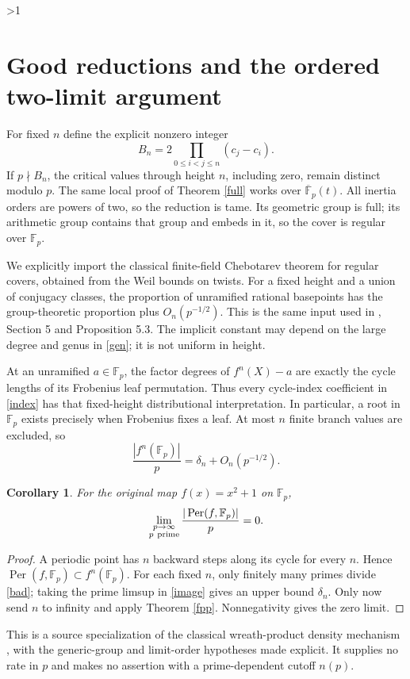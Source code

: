 \documentclass[10pt]{article}
\newtheorem{corollary}{Corollary}
\newcommand{\Per}{\operatorname{Per}}
\begin{document}
\ifnum\CRevisionRound>1
\section{Good reductions and the ordered two-limit argument}
For fixed $n$ define the explicit nonzero integer
\begin{equation}\label{bad}
 B_n=2\prod_{0\le i<j\le n}(c_j-c_i).
\end{equation}
If $p\nmid B_n$, the critical values through height $n$, including zero,
remain distinct modulo $p$. The same local proof of Theorem \ref{full}
works over $\overline{\mathbb F}_p(t)$. All inertia orders are powers of
two, so the reduction is tame. Its geometric group is full; its
arithmetic group contains that group and embeds in it, so the cover
is regular over $\mathbb F_p$.

We explicitly import the classical finite-field Chebotarev theorem for
regular covers, obtained from the Weil bounds on twists.
For a fixed height and a union of conjugacy classes, the proportion of
unramified rational basepoints has the group-theoretic proportion plus
$O_n(p^{-1/2})$. This is the same input used in \cite{jkmt},
Section 5 and Proposition 5.3. The implicit constant may depend on the
large degree and genus in \eqref{gen}; it is not uniform in height.

At an unramified $a\in\mathbb F_p$, the factor degrees of
$f^n(X)-a$ are exactly the cycle lengths of its Frobenius leaf permutation.
Thus every cycle-index coefficient in \eqref{index} has that fixed-height
distributional interpretation. In particular, a root in $\mathbb F_p$
exists precisely when Frobenius fixes a leaf.
At most $n$ finite branch values are excluded, so
\begin{equation}\label{image}
 \frac{|f^n(\mathbb F_p)|}{p}=\delta_n+O_n(p^{-1/2}).
\end{equation}

\begin{corollary}\label{density}
For the original map $f(x)=x^2+1$ on $\mathbb F_p$,
\[
 \lim_{\substack{p\to\infty\\p\ {\rm prime}}}
        \frac{|\Per(f,\mathbb F_p)|}{p}=0.
\]
\end{corollary}
\begin{proof}
A periodic point has $n$ backward steps along its cycle for every $n$.
Hence $\Per(f,\mathbb F_p)\subset f^n(\mathbb F_p)$.
For each fixed $n$, only finitely many primes divide \eqref{bad};
taking the prime limsup in \eqref{image} gives an upper bound $\delta_n$.
Only now send $n$ to infinity and apply Theorem \ref{fpp}.
Nonnegativity gives the zero limit.
\end{proof}
This is a source specialization of the classical wreath-product density
mechanism \cite{jkmt}, with the generic-group and limit-order hypotheses
made explicit. It supplies no rate in $p$ and makes no assertion with
a prime-dependent cutoff $n(p)$.
\end{document}

